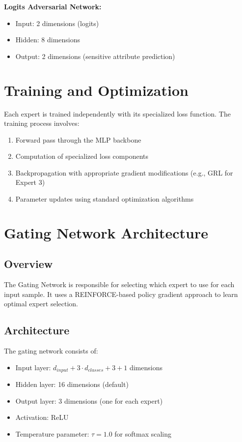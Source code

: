 \documentclass[11pt]{article}
\begin{document}
\textbf{Logits Adversarial Network:}
\begin{itemize}
    \item Input: 2 dimensions (logits)
    \item Hidden: 8 dimensions
    \item Output: 2 dimensions (sensitive attribute prediction)
\end{itemize}

\section{Training and Optimization}

Each expert is trained independently with its specialized loss function. The training process involves:

\begin{enumerate}
    \item Forward pass through the MLP backbone
    \item Computation of specialized loss components
    \item Backpropagation with appropriate gradient modifications (e.g., GRL for Expert 3)
    \item Parameter updates using standard optimization algorithms
\end{enumerate}

\section{Gating Network Architecture}

\subsection{Overview}
The Gating Network is responsible for selecting which expert to use for each input sample. It uses a REINFORCE-based policy gradient approach to learn optimal expert selection.

\subsection{Architecture}
The gating network consists of:
\begin{itemize}
    \item Input layer: $d_{input} + 3 \cdot d_{classes} + 3 + 1$ dimensions
    \item Hidden layer: 16 dimensions (default)
    \item Output layer: 3 dimensions (one for each expert)
    \item Activation: ReLU
    \item Temperature parameter: $\tau = 1.0$ for softmax scaling
\end{itemize}
\end{document}
